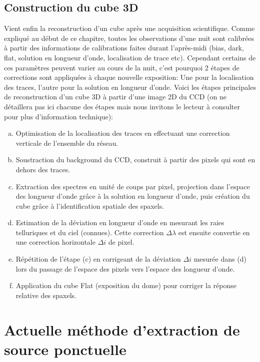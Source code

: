 \documentclass[../main/main.tex]{subfiles}
\begin{document}
\subsection{Construction du cube 3D}\label{ssec:3dcubecons}
Vient enfin la reconstruction d'un cube après une acquisition
scientifique. Comme expliqué au début de ce chapitre,
toutes les observations d'une nuit sont calibrées 
à partir des informations de calibrations faites durant l'après-midi
(bias, dark, flat, solution en longueur d'onde, localisation de trace
etc).
Cependant certains de ces paramètres peuvent varier au cours de la nuit,
c'est pourquoi 2 étapes de corrections sont appliquées à chaque nouvelle
exposition: Une pour la localisation des traces, l'autre pour la
solution en longueur d'onde. Voici les étapes principales de
reconstruction d'un cube 3D à partir d'une image 2D du CCD (on ne
détaillera pas ici chacune des étapes mais nous invitons le lecteur à
consulter \citet{pysedm} pour plus d'information technique):

\begin{enumerate}[(a)]
\itemsep=0em
\item Optimisation de la localisation des traces en effectuant une
  correction verticale de l'ensemble du réseau.
\item Soustraction du background du CCD, construit à partir des pixels
  qui sont en dehors des traces. 
\item Extraction des spectres en unité de coups par pixel, projection dans
  l'espace des longueur d'onde grâce à la solution en longueur d'onde,
  puis création du cube grâce à l'identification spatiale des spaxels.
\item Estimation de la déviation en longueur d'onde en mesurant les
  raies telluriques et du ciel (connues). Cette correction
  $\Delta\lambda$ est ensuite convertie en une correction horizontale
  $\Delta i$ de pixel.
\item Répétition de l'étape (c) en corrigeant de la déviation $\Delta i$
  mesurée dans (d) lors du passage de l'espace des pixels vers l'espace
  des longueur d'onde.
\item Application du cube Flat (exposition du dome) pour corriger la réponse relative des spaxels.
\end{enumerate}

\section{Actuelle méthode d'extraction de source ponctuelle}
\label{ssec:pysedmextractstar}
\end{document}
